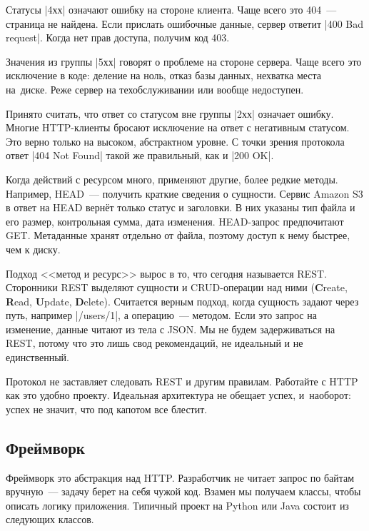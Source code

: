 Статусы \spverb|4хх| означают ошибку на стороне клиента. Чаще всего это 404~---
страница не найдена. Если прислать ошибочные данные, сервер ответит
\spverb|400 Bad request|. Когда нет прав доступа, получим код 403.

Значения из группы \spverb|5хх| говорят о проблеме на стороне сервера. Чаще всего
это исключение в коде: деление на ноль, отказ базы данных, нехватка места
на~диске. Реже сервер на техобслуживании или вообще недоступен.

Принято считать, что ответ со статусом вне группы \spverb|2хх| означает
ошибку. Многие HTTP-клиенты бросают исключение на ответ с негативным статусом.
Это верно только на высоком, абстрактном уровне. С точки зрения протокола ответ
\spverb|404 Not Found| такой же правильный, как и \spverb|200 OK|.


Когда действий с ресурсом много, применяют другие, более редкие
методы. Например, HEAD~--- получить краткие сведения о сущности. Сервис Amazon
S3 в ответ на HEAD верн\"{е}т только статус и заголовки. В них указаны тип файла и
его размер, контрольная сумма, дата изменения. HEAD-запрос предпочитают
GET. Метаданные хранят отдельно от файла, поэтому доступ к нему быстрее, чем к
диску.


Подход <<метод и ресурс>> вырос в то, что сегодня называется
REST. Сторонники REST выделяют сущности и
CRUD-операции над ними (\textbf{C}reate, \textbf{R}ead, \textbf{U}pdate,
\textbf{D}elete). Считается верным подход, когда сущность задают через путь,
например \spverb|/users/1|, а операцию~--- методом. Если это запрос на
изменение, данные читают из тела с JSON. Мы не будем задерживаться на REST,
потому что это лишь свод рекомендаций, не идеальный и не единственный.


Протокол не заставляет следовать REST и другим правилам. Работайте с HTTP как
это удобно проекту. Идеальная архитектура не обещает успех, и~наоборот: успех не
значит, что под капотом все блестит.

\subsection{Фреймворк}


Фреймворк это абстракция над HTTP. Разработчик не читает запрос по байтам
вручную~--- задачу берет на себя чужой код. Взамен мы получаем классы, чтобы
описать логику приложения. Типичный проект на Python или Java состоит из
следующих классов.

